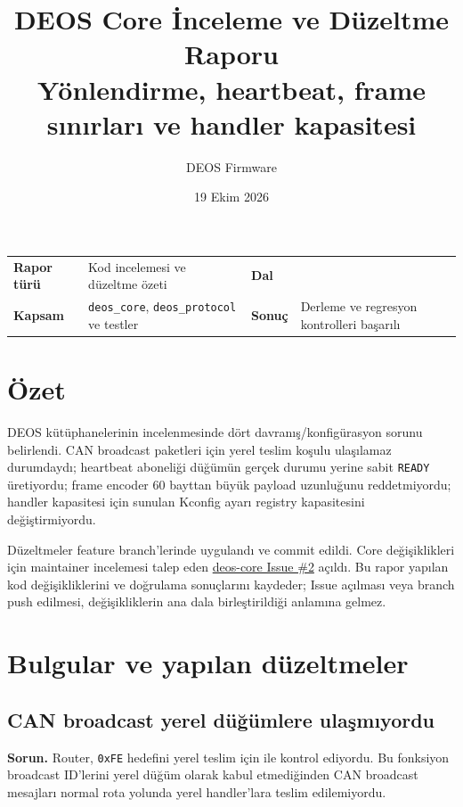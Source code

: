 \documentclass[a4paper,11pt]{article}
\title{\textbf{DEOS Core İnceleme ve Düzeltme Raporu}\\
\large Yönlendirme, heartbeat, frame sınırları ve handler kapasitesi}
\author{DEOS Firmware}
\date{19 Ekim 2026}
\begin{document}
\maketitle

\begin{center}
\small
\begin{tabularx}{\textwidth}{p{3.4cm}Y p{3.1cm}Y}
\toprule
\textbf{Rapor türü} & Kod incelemesi ve düzeltme özeti &
\textbf{Dal} &  \\
\textbf{Kapsam} & \texttt{deos\_core}, \texttt{deos\_protocol} ve testler &
\textbf{Sonuç} & Derleme ve regresyon kontrolleri başarılı \\
\bottomrule
\end{tabularx}
\end{center}

\section{Özet}

DEOS kütüphanelerinin incelenmesinde dört davranış/konfigürasyon sorunu
belirlendi. CAN broadcast paketleri için yerel teslim koşulu ulaşılamaz
durumdaydı; heartbeat aboneliği düğümün gerçek durumu yerine sabit
\texttt{READY} üretiyordu; frame encoder 60 bayttan büyük payload uzunluğunu
reddetmiyordu; handler kapasitesi için sunulan Kconfig ayarı registry
kapasitesini değiştirmiyordu.

Düzeltmeler feature branch’lerinde uygulandı ve commit edildi. Core değişiklikleri
için maintainer incelemesi talep eden
\href{https://github.com/DEUDEOS-Team/deos-core/issues/2}{deos-core Issue \#2}
açıldı. Bu rapor yapılan kod değişikliklerini ve doğrulama sonuçlarını kaydeder;
Issue açılması veya branch push edilmesi, değişikliklerin ana dala birleştirildiği
anlamına gelmez.

\section{Bulgular ve yapılan düzeltmeler}

\subsection{CAN broadcast yerel düğümlere ulaşmıyordu}

\textbf{Sorun.} Router, \texttt{0xFE} hedefini yerel teslim için
 ile kontrol ediyordu. Bu fonksiyon broadcast
ID’lerini yerel düğüm olarak kabul etmediğinden CAN broadcast mesajları normal
rota yolunda yerel handler’lara teslim edilemiyordu.
\end{document}
